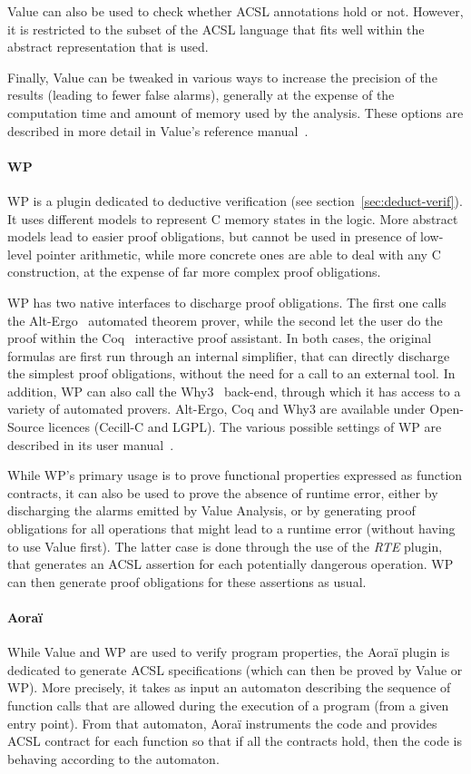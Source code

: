\documentclass{template/openetcs_report}
\begin{document}
Value can also be used to check whether ACSL annotations hold or
not. However, it is restricted to the subset of the ACSL language that
fits well within the abstract representation that is used.

Finally, Value can be tweaked in various ways to increase the
precision of the results (leading to fewer false alarms), generally at
the expense of the computation time and amount of memory used by the
analysis. These options are described in more detail in Value's
reference manual~\cite{frama-c-va}.

\paragraph{WP} 
WP is a plugin dedicated to deductive verification 
(see section~\ref{sec:deduct-verif}). It uses different models 
to represent C memory states in the logic. More abstract models lead to easier
proof obligations, but cannot be used in presence of low-level pointer 
arithmetic, while more concrete ones are able to deal with any C construction,
at the expense of far more complex proof obligations.

WP has two native interfaces to discharge proof obligations. The first one calls
the Alt-Ergo~\cite{alt-ergo} automated theorem prover, while the second let the
user do the proof within the Coq~\cite{coq} interactive proof assistant. In
both cases, the original formulas are first run through an internal simplifier,
that can directly discharge the simplest proof obligations, without the need
for a call to an external tool. In addition, WP can also call the
Why3~\cite{why3} back-end, through which it has access to a
variety of automated provers. Alt-Ergo, Coq and Why3 are available
under Open-Source licences (Cecill-C and LGPL). The various possible settings
of WP are described in its user manual~\cite{WP}.

While WP's primary usage is to prove functional properties expressed as 
function contracts, it can also be used to prove the absence of runtime error,
either by discharging the alarms emitted by Value Analysis, or by generating
proof obligations for all operations that might lead to a runtime error 
(without having to use Value first). The latter case is done through the use
of the \emph{RTE} plugin, that generates an ACSL assertion for each potentially
dangerous operation. WP can then generate proof obligations for these assertions
as usual.

\paragraph{Aoraï}
While Value and WP are used to verify program properties, the Aoraï plugin is
dedicated to generate ACSL specifications (which can then be proved by Value
or WP). More precisely, it takes as input an automaton describing the sequence
of function calls that are allowed during the execution of a program (from a
given entry point). From that automaton, Aoraï instruments the code and provides
ACSL contract for each function so that if all the contracts hold, then the
code is behaving according to the automaton.
\end{document}
